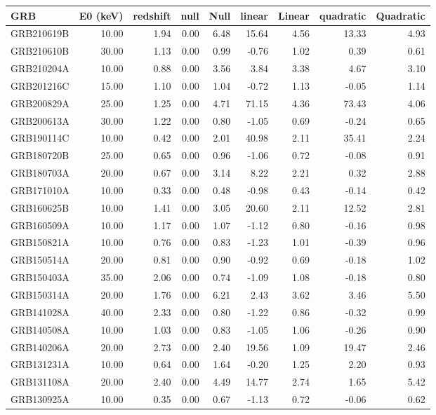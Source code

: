 \begin{tabular}{lrrrrrrrr}
\toprule
GRB & E0 (keV) & redshift & null & Null & linear & Linear & quadratic & Quadratic \\
\midrule
GRB210619B & 10.00 & 1.94 & 0.00 & 6.48 & 15.64 & 4.56 & 13.33 & 4.93 \\
GRB210610B & 30.00 & 1.13 & 0.00 & 0.99 & -0.76 & 1.02 & 0.39 & 0.61 \\
GRB210204A & 10.00 & 0.88 & 0.00 & 3.56 & 3.84 & 3.38 & 4.67 & 3.10 \\
GRB201216C & 15.00 & 1.10 & 0.00 & 1.04 & -0.72 & 1.13 & -0.05 & 1.14 \\
GRB200829A & 25.00 & 1.25 & 0.00 & 4.71 & 71.15 & 4.36 & 73.43 & 4.06 \\
GRB200613A & 30.00 & 1.22 & 0.00 & 0.80 & -1.05 & 0.69 & -0.24 & 0.65 \\
GRB190114C & 10.00 & 0.42 & 0.00 & 2.01 & 40.98 & 2.11 & 35.41 & 2.24 \\
GRB180720B & 25.00 & 0.65 & 0.00 & 0.96 & -1.06 & 0.72 & -0.08 & 0.91 \\
GRB180703A & 20.00 & 0.67 & 0.00 & 3.14 & 8.22 & 2.21 & 0.32 & 2.88 \\
GRB171010A & 10.00 & 0.33 & 0.00 & 0.48 & -0.98 & 0.43 & -0.14 & 0.42 \\
GRB160625B & 10.00 & 1.41 & 0.00 & 3.05 & 20.60 & 2.11 & 12.52 & 2.81 \\
GRB160509A & 10.00 & 1.17 & 0.00 & 1.07 & -1.12 & 0.80 & -0.16 & 0.98 \\
GRB150821A & 10.00 & 0.76 & 0.00 & 0.83 & -1.23 & 1.01 & -0.39 & 0.96 \\
GRB150514A & 20.00 & 0.81 & 0.00 & 0.90 & -0.92 & 0.69 & -0.18 & 1.02 \\
GRB150403A & 35.00 & 2.06 & 0.00 & 0.74 & -1.09 & 1.08 & -0.18 & 0.80 \\
GRB150314A & 20.00 & 1.76 & 0.00 & 6.21 & 2.43 & 3.62 & 3.46 & 5.50 \\
GRB141028A & 40.00 & 2.33 & 0.00 & 0.80 & -1.22 & 0.86 & -0.32 & 0.99 \\
GRB140508A & 10.00 & 1.03 & 0.00 & 0.83 & -1.05 & 1.06 & -0.26 & 0.90 \\
GRB140206A & 20.00 & 2.73 & 0.00 & 2.40 & 19.56 & 1.09 & 19.47 & 2.46 \\
GRB131231A & 10.00 & 0.64 & 0.00 & 1.64 & -0.20 & 1.25 & 2.20 & 0.93 \\
GRB131108A & 20.00 & 2.40 & 0.00 & 4.49 & 14.77 & 2.74 & 1.65 & 5.42 \\
GRB130925A & 10.00 & 0.35 & 0.00 & 0.67 & -1.13 & 0.72 & -0.06 & 0.62 \\

\end{tabular}
